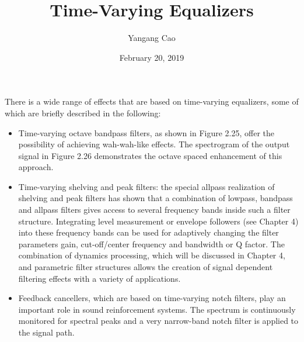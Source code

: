 \documentclass[10pt,a4paper,oneside]{article}
\author{Yangang Cao}
\date{February 20, 2019}
\begin{document}
\title{Time-Varying Equalizers }
\maketitle 
There is a wide range of effects that are based on time-varying equalizers, some of which are briefly described in the following:
\begin{itemize}
\item Time-varying octave bandpass filters, as shown in Figure 2.25, offer the possibility of achieving wah-wah-like effects. The spectrogram of the output signal in Figure 2.26 demonstrates the octave spaced enhancement of this approach.
\item Time-varying shelving and peak filters: the special allpass realization of shelving and peak filters has shown that a combination of lowpass, bandpass and allpass filters gives access to several frequency bands inside such a filter structure. Integrating level measurement or envelope followers (see Chapter 4) into these frequency bands can be used for adaptively changing the filter parameters gain, cut-off/center frequency and bandwidth or Q factor. The combination of dynamics processing, which will be discussed in Chapter 4, and parametric filter structures allows the creation of signal dependent filtering effects with a variety of applications.
\item Feedback cancellers, which are based on time-varying notch filters, play an important role in sound reinforcement systems. The spectrum is continuously monitored for spectral peaks and a very narrow-band notch filter is applied to the signal path.
\end{itemize}
\end{document}
